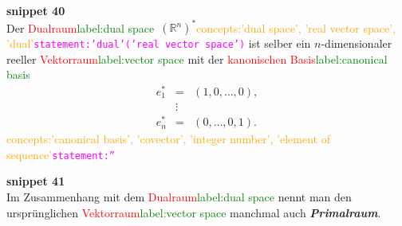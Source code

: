 \documentclass[a4paper,twoside,english,ngerman,deutsch,german,sectrefs,envcountsame,envcountchap]{svmono}
\newcommand{\setref}[2]{\textcolor{red}{#1}\textcolor{green}{#2}}
\newcommand{\snippet}[1]{\textbf{snippet #1}\\}
\newcommand{\eqnote}[2]{\textcolor{orange}{#1}\textcolor{magenta}{\texttt{#2}}}
\begin{document}
\snippet{40}
Der \setref{Dualraum}{label:dual space}~$({\mathbb{R}}^{n})^{*}$\eqnote{concepts:'dual space', 'real vector space', 'dual'}{statement:'dual'('real vector space')} ist selber ein $n$-dimensionaler reeller \setref{Vektorraum}{label:vector space} mit der \setref{kanonischen Basis}{label:canonical basis}
\[
\begin{array}{lcl}
e_{1}^{*} & = & \left(1,0,\ldots,0\right),\\
 & \vdots\\
e_{n}^{*} & = & (0,\ldots,0,1).
\end{array}
\]\eqnote{concepts:'canonical basis', 'covector', 'integer number', 'element of sequence'}{statement:''}

\snippet{41}
Im Zusammenhang mit dem \setref{Dualraum}{label:dual space} nennt man den ursprünglichen \setref{Vektorraum}{label:vector space} manchmal auch \textbf{\em Primalraum}.
\end{document}
